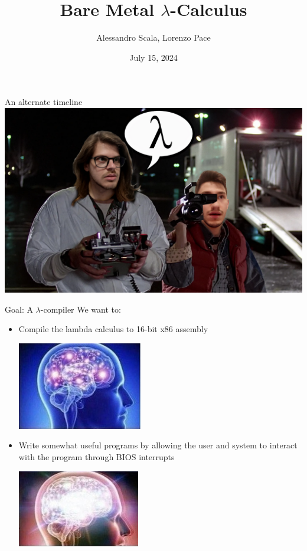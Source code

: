 \documentclass{beamer}
\title{Bare Metal $\lambda$-Calculus}
\author{Alessandro Scala, Lorenzo Pace}
\date{July 15, 2024}
\begin{document}
 \maketitle

 \begin{frame}{An alternate timeline}
 \includegraphics [scale = .76] {time}
 \end{frame}

 \begin{frame}{Goal: A $\lambda$-compiler}
We want to:
 \begin{itemize}
 \item Compile the lambda calculus to 16-bit x86 assembly

 \begin{center}
  \includegraphics[scale = .6]{brain2}
 \end{center}


 \item Write somewhat useful programs by allowing the user and system to interact with the program through BIOS interrupts

 \begin{center}
  \includegraphics[scale = .6]{brain3}
 \end{center}

\end{itemize}

 \end{frame}
\end{document}
